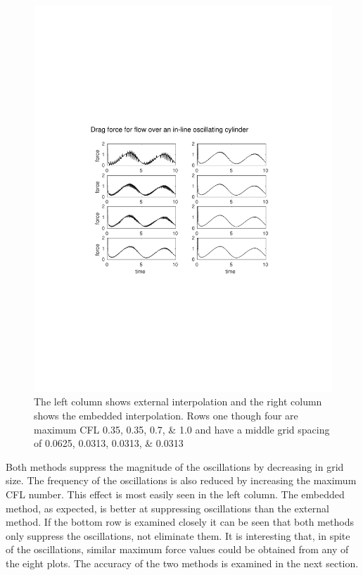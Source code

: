 \begin{figure}[!htb]
	\centering
	\includegraphics[width=\textwidth]{cropped_oscflow}
	\caption{The left column shows external interpolation and the right column shows the embedded interpolation. Rows one though four are maximum CFL \numlist{0.35; 0.35; 0.7; 1.0} and have a middle grid spacing of \numlist{0.0625; 0.0313; 0.0313; 0.0313}}
	\label{fig:osccylinder}
\end{figure}

Both methods suppress the magnitude of the oscillations by decreasing in grid size.
The frequency of the oscillations is also reduced by increasing the maximum CFL number.
This effect is most easily seen in the left column.
The embedded method, as expected, is better at suppressing oscillations than the external method.
If the bottom row is examined closely it can be seen that both methods only suppress the oscillations, not eliminate them.
It is interesting that, in spite of the oscillations, similar maximum force values could be obtained from any of the eight plots.
The accuracy of the two methods is examined in the next section.

